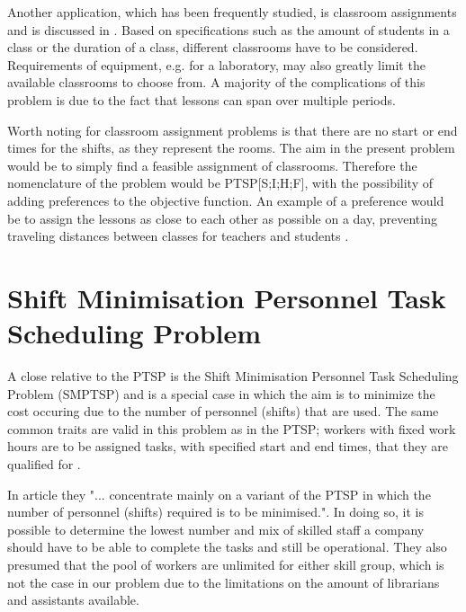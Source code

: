 Another application, which has been frequently studied, is classroom assignments and is discussed in \citet{krishnamoorthy_2001}. Based on specifications such as the amount of students in a class or the duration of a class, different classrooms have to be considered. Requirements of equipment, e.g. for a laboratory, may also greatly limit the available classrooms to choose from. A majority of the complications of this problem is due to the fact that lessons can span over multiple periods. 

Worth noting for classroom assignment problems is that there are no start or end times for the shifts, as they represent the rooms. The aim in the present problem would be to simply find a feasible assignment of classrooms. Therefore the nomenclature of the problem would be PTSP[S;I;H;F], with the possibility of adding preferences to the objective function. An example of a preference would be to assign the lessons as close to each other as possible on a day, preventing traveling distances between classes for teachers and students \citet{krishnamoorthy_2001}.



%
%



\section{Shift Minimisation Personnel Task Scheduling Problem}\label{SMTSP}

A close relative to the PTSP is the Shift Minimisation Personnel Task Scheduling Problem (SMPTSP) and is a special case in which the aim is to minimize the cost occuring due to the number of personnel (shifts) that are used. The same common traits are valid in this problem as in the PTSP; workers with fixed work hours are to be assigned tasks, with specified start and end times, that they are qualified for \citet{krishnamoorthy_2011}.

In article \citet{krishnamoorthy_2011} they "... concentrate mainly on a variant of the PTSP in which the number of personnel (shifts) required is to be minimised.". In doing so, it is possible to determine the lowest number and mix of skilled staff a company should have to be able to complete the tasks and still be operational. They also presumed that the pool of workers are unlimited for either skill group, which is not the case in our problem due to the limitations on the amount of librarians and assistants available. 

